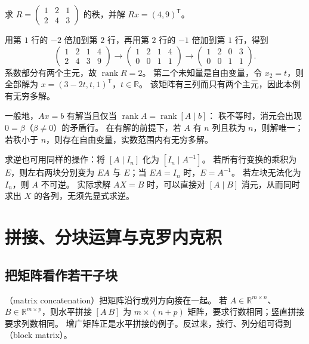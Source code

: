 \documentclass[UTF8,12pt,a4paper,fontset=fandol]{ctexart}
\begin{document}
\begin{example}[用消元同时求秩与解方程]
求 $R=\begin{pmatrix}1&2&1\\2&4&3\end{pmatrix}$ 的秩，并解
$Rx=(4,9)^{\mathsf T}$。
\end{example}
\begin{solve}
用第 $1$ 行的 $-2$ 倍加到第 $2$ 行，再用第 $2$ 行的 $-1$ 倍加到第 $1$ 行，得到
\[
  \left(\begin{array}{ccc|c}1&2&1&4\\2&4&3&9\end{array}\right)
  \longrightarrow
  \left(\begin{array}{ccc|c}1&2&1&4\\0&0&1&1\end{array}\right)
  \longrightarrow
  \left(\begin{array}{ccc|c}1&2&0&3\\0&0&1&1\end{array}\right).
\]
系数部分有两个主元，故 $\operatorname{rank}R=2$。
第二个未知量是自由变量，令 $x_2=t$，则全部解为
$x=(3-2t,t,1)^{\mathsf T}$，$t\in\mathbb R$。
该矩阵有三列而只有两个主元，因此本例有无穷多解。
\end{solve}

一般地，$Ax=b$ 有解当且仅当 $\operatorname{rank}A=\operatorname{rank}[A\mid b]$：
秩不等时，消元会出现 $0=\beta$（$\beta\ne0$）的矛盾行。
在有解的前提下，若 $A$ 有 $n$ 列且秩为 $n$，则解唯一；若秩小于 $n$，则存在自由变量，实数范围内有无穷多解。

求逆也可用同样的操作：将 $[A\mid I_n]$ 化为 $[I_n\mid A^{-1}]$。
若所有行变换的乘积为 $E$，则左右两块分别变为 $EA$ 与 $E$；当 $EA=I_n$ 时，$E=A^{-1}$。
若左块无法化为 $I_n$，则 $A$ 不可逆。
实际求解 $AX=B$ 时，可以直接对 $[A\mid B]$ 消元，从而同时求出 $X$ 的各列，无须先显式求逆。

\section{拼接、分块运算与克罗内克积}

\subsection{把矩阵看作若干子块}

（matrix concatenation）把矩阵沿行或列方向接在一起。
若 $A\in\mathbb R^{m\times n}$、$B\in\mathbb R^{m\times p}$，则水平拼接 $[A\ B]$
为 $m\times(n+p)$ 矩阵，要求行数相同；竖直拼接要求列数相同。
增广矩阵正是水平拼接的例子。反过来，按行、列分组可得到（block matrix）。
\end{document}
